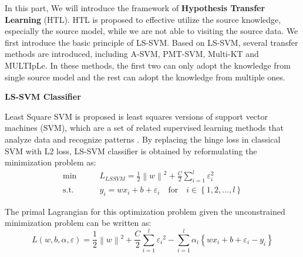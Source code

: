 In this part, We will introduce the framework of \textbf{Hypothesis Transfer Learning} (HTL). HTL is proposed to effective utilize the source knowledge, especially the source model, while we are not able to visiting the source data. We first introduce the basic principle of LS-SVM. Based on LS-SVM, several transfer methods are introduced, including A-SVM, PMT-SVM, Multi-KT and MULTIpLe. In these methods, the first two can only adopt the knowledge from single source model and the rest can adopt the knowledge from multiple ones.

\textbf{LS-SVM Classifier}

Least Square SVM is proposed is least squares versions of support vector machines (SVM), which are a set of related supervised learning methods that analyze data and recognize patterns \cite{suykens1999least}. By replacing the hinge loss in classical SVM with L2 loss, LS-SVM classifier is obtained by reformulating the minimization problem as: 
\begin{equation}\label{eq:gama:lssvm}
\begin{aligned}
\min \qquad& L_{LSSVM} = \frac{1}{2}{\left\| w \right\|^2} + \frac{C}{2}\sum\limits_{i = 1}^l {{\varepsilon_i ^2}}\\
\text{s.t.}\qquad&{y_i} = w{x_i} + b + {\varepsilon _i} \quad   \text{for} \quad i \in \left\{ {1,2,...,l} \right\}
\end{aligned}
\end{equation}

The primal Lagrangian for this optimization problem given the unconstrained minimization problem can be written as:
\begin{equation}\label{sq:gama:lsprime}
  L\left( {w,b,\alpha ,\varepsilon } \right) = \frac{1}{2}{\left\| w \right\|^2} + \frac{C}{2}\sum\limits_{i = 1}^l {{\varepsilon _i}^2}  - \sum\limits_{i = 1}^l {{\alpha _i}\left\{ {w{x_i} + b + {\varepsilon _i} - {y_i}} \right\}}
\end{equation}

